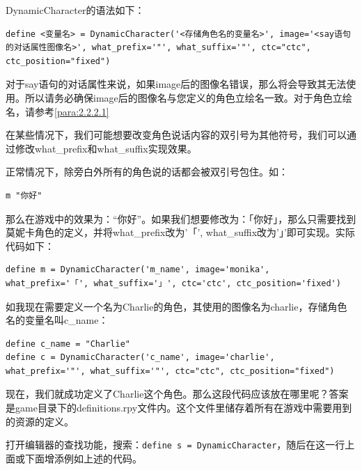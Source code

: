 \documentclass[../../Main.tex]{subfiles}
\begin{document}
DynamicCharacter的语法如下：

\begin{lstlisting}
define <变量名> = DynamicCharacter('<存储角色名的变量名>', image='<say语句的对话属性图像名>', what_prefix='"', what_suffix='"', ctc="ctc", ctc_position="fixed")
\end{lstlisting}

\begin{Warning}
    对于say语句的对话属性来说，如果image后的图像名错误，那么将会导致其无法使用。所以请务必确保image后的图像名与您定义的角色立绘名一致。对于角色立绘名，请参考\ref{para:2.2.2.1}
\end{Warning}

\begin{ExtraKnowledge}
    
    在某些情况下，我们可能想要改变角色说话内容的双引号为其他符号，我们可以通过修改what\_prefix和what\_suffix实现效果。

    正常情况下，除旁白外所有的角色说的话都会被双引号包住。如：
    \begin{lstlisting}
m "你好"
    \end{lstlisting}

    那么在游戏中的效果为：“你好”。如果我们想要修改为：「你好」，那么只需要找到莫妮卡角色的定义，并将what\_prefix改为'「', what\_suffix改为'」'即可实现。实际代码如下：
    \begin{lstlisting}
define m = DynamicCharacter('m_name', image='monika', what_prefix='「', what_suffix='」', ctc='ctc', ctc_position='fixed')
    \end{lstlisting}
\end{ExtraKnowledge}

如我现在需要定义一个名为Charlie的角色，其使用的图像名为charlie，存储角色名的变量名叫c\_name：
\begin{lstlisting}
define c_name = "Charlie"
define c = DynamicCharacter('c_name', image='charlie', what_prefix='"', what_suffix='"', ctc="ctc", ctc_position="fixed")
\end{lstlisting}

现在，我们就成功定义了Charlie这个角色。那么这段代码应该放在哪里呢？答案是game目录下的definitions.rpy文件内。这个文件里储存着所有在游戏中需要用到的资源的定义。

打开编辑器的查找功能，搜索：\verb|define s = DynamicCharacter|，随后在这一行上面或下面增添例如上述的代码。
\end{document}
